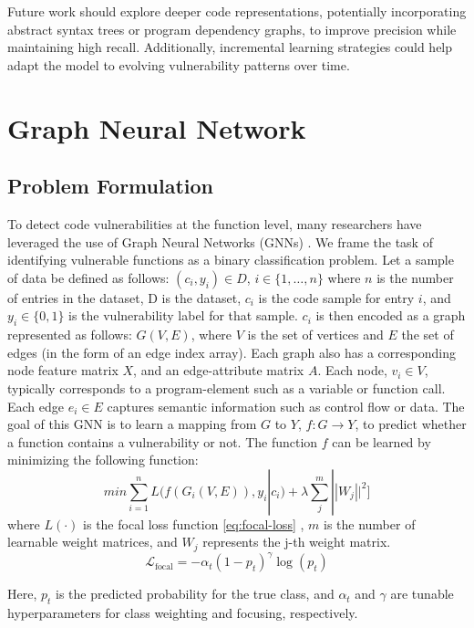 \documentclass{article}
\begin{document}
Future work should explore deeper code representations, potentially incorporating abstract syntax trees or program dependency graphs, to improve precision while maintaining high recall. Additionally, incremental learning strategies could help adapt the model to evolving vulnerability patterns over time.

\section{Graph Neural Network}

\subsection{Problem Formulation}
To detect code vulnerabilities at the function level, many researchers have leveraged the use of Graph Neural Networks (GNNs) \cite{ample, devign}. We frame the task of identifying vulnerable functions as a binary classification problem. Let a sample of data be defined as follows: 
\((c_i, y_i) \in D\), \( i \in \{1, \ldots, n\} \) where $n$ is the number of entries in the dataset, D is the dataset, $c_i$ is the code sample for entry $i$, and $y_i \in \{0, 1\}$ is the vulnerability label for that sample. $c_i$ is then encoded as a graph represented as follows: $G(V, E)$, where $V$ is the set of vertices and $E$ the set of edges (in the form of an edge index array). Each graph also has a corresponding node feature matrix $X$, and an edge-attribute matrix $A$. Each node, $v_i \in V$, typically corresponds to a program-element such as a variable or function call. Each edge $e_i \in E$ captures semantic information such as control flow or data. The goal of this GNN is to learn a mapping from $G$ to $Y$, $f: G \to Y$, to predict whether a function contains a vulnerability or not. The function $f$ can be learned by minimizing the following function:
\[min\sum_{i=1}^{n}L(f(G_i(V, E)), y_i | c_i) + \lambda \sum_j^m||W_j||^2] \]
where $L(\cdot)$ is the focal loss function \eqref{eq:focal-loss} \cite{focalloss} , $m$ is the number of learnable weight matrices, and $W_j$ represents the j-th weight matrix.
\begin{equation}
\mathcal{L}_{\text{focal}} = -\alpha_t (1 - p_t)^\gamma \log(p_t)
\label{eq:focal-loss}
\end{equation}

Here, $p_t$ is the predicted probability for the true class, and $\alpha_t$ and $\gamma$ are tunable hyperparameters for class weighting and focusing, respectively.
\end{document}
